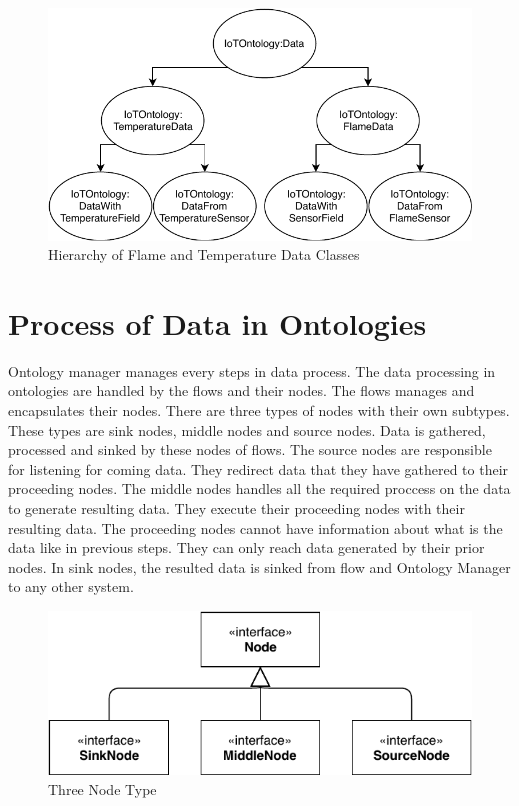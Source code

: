 \begin{figure}[H]
  \centering
  \includegraphics[width=\textwidth,height=\textheight,keepaspectratio]{figures/data_hierarchy.pdf}
  \caption[Data Class Hierarchy]{Hierarchy of Flame and Temperature Data Classes}\label{fig:data_hierarchy}
\end{figure}


\section{Process of Data in Ontologies}\label{section:data_process}

Ontology manager manages every steps in data process. The data processing in ontologies are handled by the flows and their nodes. The flows manages and encapsulates their nodes. There are three types of nodes with their own subtypes. These types are sink nodes, middle nodes and source nodes. Data is gathered, processed and sinked by these nodes of flows. The source nodes are responsible for listening for coming data. They redirect data that they have gathered to their proceeding nodes. The middle nodes handles all the required proccess on the data to generate resulting data. They execute their proceeding nodes with their resulting data. The proceeding nodes cannot have information about what is the data like in previous steps. They can only reach data generated by their prior nodes. In sink nodes, the resulted data is sinked from flow and Ontology Manager to any other system.

\begin{figure}[H]
  \centering
  \includegraphics[width=\textwidth,height=\textheight,keepaspectratio]{figures/node_types.pdf}
  \caption[Node Types]{Three Node Type}\label{fig:node_types}
\end{figure}

